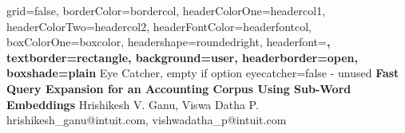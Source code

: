 \documentclass[a0paper,portrait]{baposter}
\begin{document}
\begin{poster}{
	grid=false,
	borderColor=bordercol,
	headerColorOne=headercol1,
	headerColorTwo=headercol2,
	headerFontColor=headerfontcol,
	boxColorOne=boxcolor,
	headershape=roundedright,
	headerfont=\Large\sf\bf,
	textborder=rectangle,
	background=user,
	headerborder=open,
  boxshade=plain
}
{
	Eye Catcher, empty if option eyecatcher=false - unused
}
{\sf\bf
	Fast Query Expansion for an Accounting Corpus Using Sub-Word Embeddings
}
{
	\vspace{1em} Hrishikesh V. Ganu, Viswa Datha P.\
	{ \small hrishikesh\_ganu@intuit.com, vishwadatha\_p@intuit.com}
}
{
\setlength\fboxsep{0pt}
\setlength\fboxrule{0.5pt}
}



\end{poster}
\end{document}
